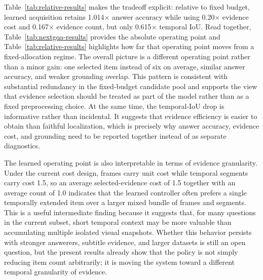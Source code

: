 \documentclass{article}
\begin{document}
Table~\ref{tab:relative-results} makes the tradeoff explicit: relative to fixed budget, learned acquisition retains 1.014$\times$ answer accuracy while using 0.20$\times$ evidence cost and 0.167$\times$ evidence count, but only 0.615$\times$ temporal IoU. Read together, Table~\ref{tab:nextgqa-results} provides the absolute operating point and Table~\ref{tab:relative-results} highlights how far that operating point moves from a fixed-allocation regime. The overall picture is a different operating point rather than a minor gain: one selected item instead of six on average, similar answer accuracy, and weaker grounding overlap. This pattern is consistent with substantial redundancy in the fixed-budget candidate pool and supports the view that evidence selection should be treated as part of the model rather than as a fixed preprocessing choice. At the same time, the temporal-IoU drop is informative rather than incidental. It suggests that evidence efficiency is easier to obtain than faithful localization, which is precisely why answer accuracy, evidence cost, and grounding need to be reported together instead of as separate diagnostics.

The learned operating point is also interpretable in terms of evidence granularity. Under the current cost design, frames carry unit cost while temporal segments carry cost 1.5, so an average selected-evidence cost of 1.5 together with an average count of 1.0 indicates that the learned controller often prefers a single temporally extended item over a larger mixed bundle of frames and segments. This is a useful intermediate finding because it suggests that, for many questions in the current subset, short temporal context may be more valuable than accumulating multiple isolated visual snapshots. Whether this behavior persists with stronger answerers, subtitle evidence, and larger datasets is still an open question, but the present results already show that the policy is not simply reducing item count arbitrarily; it is moving the system toward a different temporal granularity of evidence.
\end{document}

